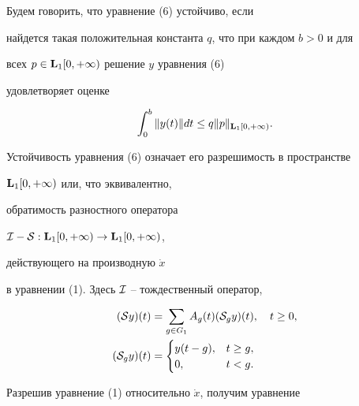%





\begin{defn} Будем говорить, что уравнение (6) устойчиво, если


найдется такая положительная константа $q$, что при каждом $b>0$ и для


всех $p\in\bold L_1[0,+\infty)$ решение $y$ уравнения (6)


удовлетворяет оценке


%


\begin{equation}


\int_0^b\|y(t)\|dt\le q\|p\|_{\bold L_1[0,+\infty)}.


\end{equation}


%


\end{defn}





Устойчивость уравнения (6) означает его разрешимость в пространстве


$\bold L_1[0,+\infty)$ или, что эквивалентно,


обратимость разностного оператора 


${\cal I-S}:\bold L_1[0,+\infty)\to\bold L_1[0,+\infty)$,


действующего на производную $\Dot x$


в уравнении (1). Здесь ${\cal I}$ -- тождественный оператор,


\begin{align*}


({\cal S}y)(t) &=\sum_{g\in G_1}A_g(t)({\cal S}_gy)(t),\quad t\ge0,\\


({\cal S}_gy)(t) &=


\begin{cases}


y(t-g), & t\ge g,\\


0, & t<g.


\end{cases}


\end{align*}





Разрешив уравнение (1) относительно $\Dot x$, получим уравнение


%


